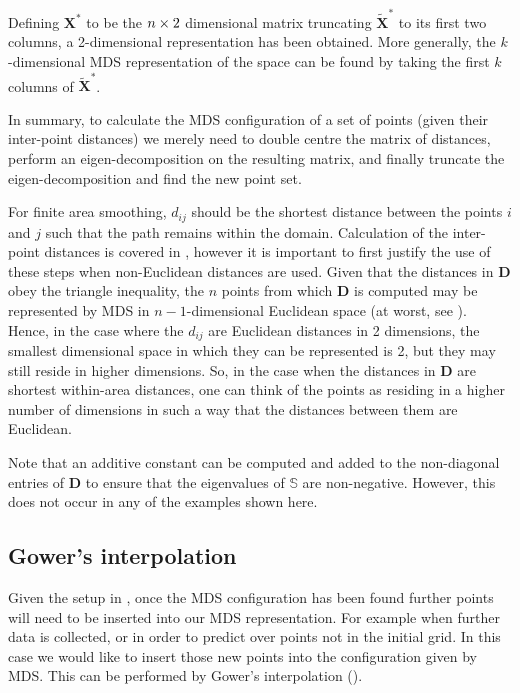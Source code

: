 Defining $\mathbf{X}^*$ to be the $n \times 2$ dimensional matrix truncating $\tilde{\mathbf{X}}^*$ to its first two columns, a 2-dimensional representation has been obtained. More generally, the $k$-dimensional MDS representation of the space can be found by taking the first $k$ columns of $\tilde{\mathbf{X}}^*$.

In summary, to calculate the MDS configuration of a set of points (given their inter-point distances) we merely need to double centre the matrix of distances, perform an eigen-decomposition on the resulting matrix, and finally truncate the eigen-decomposition and find the new point set.

For finite area smoothing, $d_{ij}$ should be the shortest distance between the points $i$ and $j$ such that the path remains within the domain. Calculation of the inter-point distances is covered in , however it is important to first justify the use of these steps when non-Euclidean distances are used. Given that the distances in $\mathbf{D}$ obey the triangle inequality, the $n$ points from which $\mathbf{D}$ is computed may be represented by MDS in $n-1$-dimensional Euclidean space (at worst, see \cite{gower1968}). Hence, in the case where the $d_{ij}$ are Euclidean distances in 2 dimensions, the smallest dimensional space in which they can be represented is 2, but they may still reside in higher dimensions. So, in the case when the distances in $\mathbf{D}$ are shortest within-area distances, one can think of the points as residing in a higher number of dimensions in such a way that the distances between them are Euclidean.

Note that an additive constant can be computed and added to the non-diagonal entries of $\mathbf{D}$ to ensure that the eigenvalues of $\mathbb{S}$ are non-negative. However, this does not occur in any of the examples shown here.

\subsection{Gower's interpolation} 
\label{gowers}
Given the setup in , once the MDS configuration has been found further points will need to be inserted into our MDS representation. For example when further data is collected, or in order to predict over points not in the initial grid. In this case we would like to insert those new points into the configuration given by MDS. This can be performed by Gower's interpolation (\cite{gower1968}).

